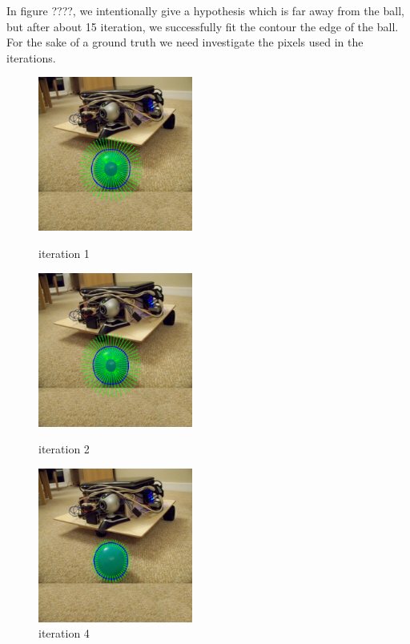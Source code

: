 In figure ????, we intentionally give a hypothesis which is far away
from the ball, but after about 15 iteration, we successfully fit the
contour the edge of the ball. For the sake of a ground truth we need
investigate the pixels used in the iterations.

\begin{figure} 
  \begin{minipage}[t]{0.45\linewidth} 
    \centering 
    \includegraphics[width=2.0in]{images/ball_normal/0.png} 
    \caption{iteration 1} 
    \label{fig:side:a} 
  \end{minipage}%
  \begin{minipage}[t]{0.45\linewidth} 
    \centering 
    \includegraphics[width=2.0in]{images/ball_normal/1.png} 
    \caption{iteration 2} 
    \label{fig:side:b} 
  \end{minipage} 
  \begin{minipage}[t]{0.45\linewidth} 
    \centering 
    \includegraphics[width=2.0in]{images/ball_normal/3.png} 
    \caption{iteration 4} 

\end{minipage}
\end{figure}
